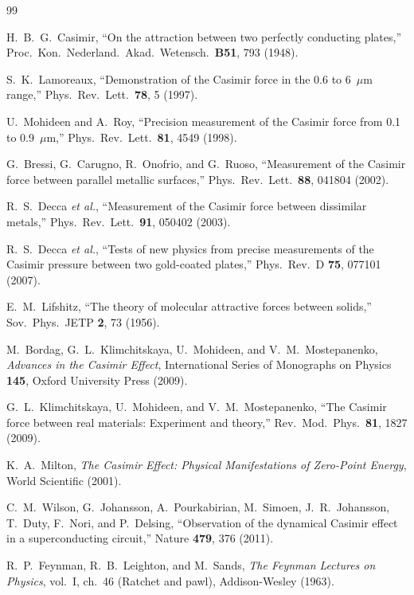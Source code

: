 \documentclass[11pt,a4paper]{article}
\begin{document}
\begin{thebibliography}{99}

H.~B.~G.~Casimir, ``On the attraction between two perfectly conducting plates,''
Proc.\ Kon.\ Nederland.\ Akad.\ Wetensch.\ \textbf{B51}, 793 (1948).

S.~K.~Lamoreaux, ``Demonstration of the Casimir force in the 0.6 to 6~$\mu$m range,''
Phys.\ Rev.\ Lett.\ \textbf{78}, 5 (1997).

U.~Mohideen and A.~Roy, ``Precision measurement of the Casimir force from 0.1 to 0.9~$\mu$m,''
Phys.\ Rev.\ Lett.\ \textbf{81}, 4549 (1998).

G.~Bressi, G.~Carugno, R.~Onofrio, and G.~Ruoso,
``Measurement of the Casimir force between parallel metallic surfaces,''
Phys.\ Rev.\ Lett.\ \textbf{88}, 041804 (2002).

R.~S.~Decca \emph{et al.},
``Measurement of the Casimir force between dissimilar metals,''
Phys.\ Rev.\ Lett.\ \textbf{91}, 050402 (2003).

R.~S.~Decca \emph{et al.},
``Tests of new physics from precise measurements of the Casimir pressure between two
gold-coated plates,''
Phys.\ Rev.\ D \textbf{75}, 077101 (2007).

E.~M.~Lifshitz, ``The theory of molecular attractive forces between solids,''
Sov.\ Phys.\ JETP \textbf{2}, 73 (1956).

M.~Bordag, G.~L.~Klimchitskaya, U.~Mohideen, and V.~M.~Mostepanenko,
\emph{Advances in the Casimir Effect}, International Series of Monographs on Physics
\textbf{145}, Oxford University Press (2009).

G.~L.~Klimchitskaya, U.~Mohideen, and V.~M.~Mostepanenko,
``The Casimir force between real materials: Experiment and theory,''
Rev.\ Mod.\ Phys.\ \textbf{81}, 1827 (2009).

K.~A.~Milton, \emph{The Casimir Effect: Physical Manifestations of Zero-Point Energy},
World Scientific (2001).

C.~M.~Wilson, G.~Johansson, A.~Pourkabirian, M.~Simoen, J.~R.~Johansson, T.~Duty, F.~Nori, and
P.~Delsing, ``Observation of the dynamical Casimir effect in a superconducting circuit,''
Nature \textbf{479}, 376 (2011).

R.~P.~Feynman, R.~B.~Leighton, and M.~Sands,
\emph{The Feynman Lectures on Physics}, vol.~I, ch.~46 (Ratchet and pawl),
Addison-Wesley (1963).


\end{thebibliography}
\end{document}

